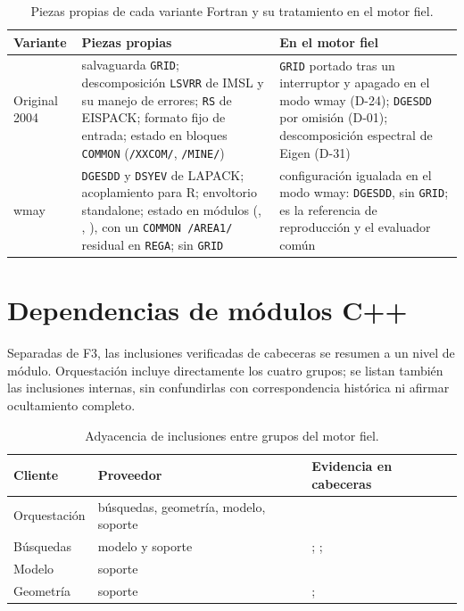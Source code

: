 \begin{table}[H]
\centering
\caption{Piezas propias de cada variante Fortran y su tratamiento en el motor fiel.}
\label{tab:variantes}
\footnotesize
\begin{tabular}{L{2.4cm}L{5.0cm}L{4.9cm}}
\toprule
Variante & Piezas propias & En el motor fiel \\
\midrule
Original 2004 & salvaguarda \texttt{GRID}; descomposición \texttt{LSVRR} de IMSL y su
manejo de errores; \texttt{RS} de EISPACK; formato fijo de entrada; estado en bloques
\texttt{COMMON} (\texttt{/XXCOM/}, \texttt{/MINE/}) & \texttt{GRID} portado tras un
interruptor y apagado en el modo wmay (D-24); \texttt{DGESDD} por omisión (D-01); descomposición
espectral de Eigen (D-31) \\
\addlinespace
wmay & \texttt{DGESDD} y \texttt{DSYEV} de LAPACK; acoplamiento para R; envoltorio
standalone; estado en módulos (, , ),
con un \texttt{COMMON /AREA1/} residual en \texttt{REGA}; sin \texttt{GRID} & configuración
igualada en el modo wmay: \texttt{DGESDD}, sin \texttt{GRID}; es la referencia de
reproducción y el evaluador común \\
\bottomrule
\end{tabular}
\end{table}

\section*{Dependencias de módulos C++}

Separadas de F3, las inclusiones verificadas de cabeceras se resumen a un nivel de módulo.
Orquestación incluye directamente los cuatro grupos; se listan también las inclusiones
internas, sin confundirlas con correspondencia histórica ni afirmar ocultamiento completo.

\begin{table}[htbp]
\centering\footnotesize
\caption{Adyacencia de inclusiones entre grupos del motor fiel.}
\begin{tabular}{L{3.0cm}L{4.0cm}L{5.4cm}}
\toprule
Cliente & Proveedor & Evidencia en cabeceras \\
\midrule
Orquestación & búsquedas, geometría, modelo, soporte &  \\
Búsquedas & modelo y soporte & ; ;  \\
Modelo & soporte &  \\
Geometría & soporte & ;  \\
\bottomrule
\end{tabular}
\end{table}

